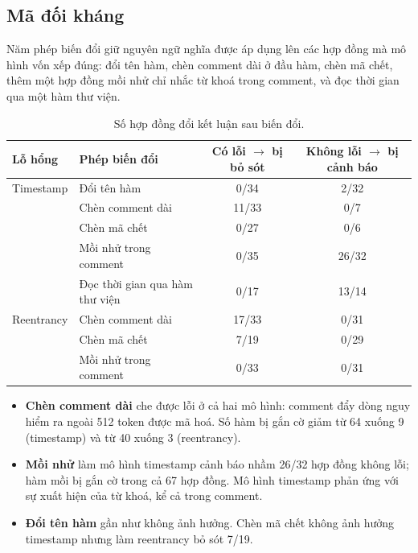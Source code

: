 \documentclass[12pt,a4paper]{article}
\begin{document}
\subsection{Mã đối kháng}
Năm phép biến đổi giữ nguyên ngữ nghĩa được áp dụng lên các hợp đồng mà mô hình vốn xếp đúng: đổi tên hàm, chèn comment dài ở đầu hàm, chèn mã chết, thêm một hợp đồng mồi nhử chỉ nhắc từ khoá trong comment, và đọc thời gian qua một hàm thư viện.
\begin{table}[H]\centering\small
\caption{Số hợp đồng đổi kết luận sau biến đổi.}\label{tab:adv}
\begin{tabular}{llcc}
\toprule
Lỗ hổng & Phép biến đổi & Có lỗi $\rightarrow$ bị bỏ sót & Không lỗi $\rightarrow$ bị cảnh báo\\
\midrule
Timestamp & Đổi tên hàm & 0/34 & 2/32\\
 & Chèn comment dài & 11/33 & 0/7\\
 & Chèn mã chết & 0/27 & 0/6\\
 & Mồi nhử trong comment & 0/35 & 26/32\\
 & Đọc thời gian qua hàm thư viện & 0/17 & 13/14\\
\midrule
Reentrancy & Chèn comment dài & 17/33 & 0/31\\
 & Chèn mã chết & 7/19 & 0/29\\
 & Mồi nhử trong comment & 0/33 & 0/31\\
\bottomrule
\end{tabular}
\end{table}
\begin{itemize}
\item \textbf{Chèn comment dài} che được lỗi ở cả hai mô hình: comment đẩy dòng nguy hiểm ra ngoài 512 token được mã hoá. Số hàm bị gắn cờ giảm từ 64 xuống 9 (timestamp) và từ 40 xuống 3 (reentrancy).
\item \textbf{Mồi nhử} làm mô hình timestamp cảnh báo nhầm 26/32 hợp đồng không lỗi; hàm mồi bị gắn cờ trong cả 67 hợp đồng. Mô hình timestamp phản ứng với sự xuất hiện của từ khoá, kể cả trong comment.
\item \textbf{Đổi tên hàm} gần như không ảnh hưởng. Chèn mã chết không ảnh hưởng timestamp nhưng làm reentrancy bỏ sót 7/19.
\end{itemize}
\end{document}
